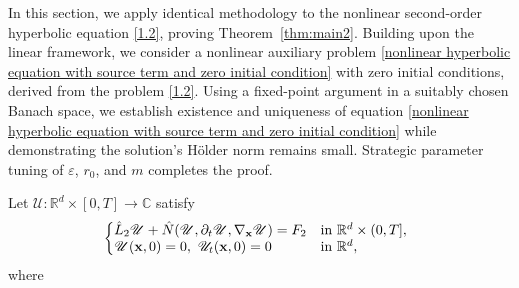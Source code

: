 \documentclass[11pt,reqno,oneside]{amsart}
\numberwithin{equation}{section}
\theoremstyle{definition}
\theoremstyle{remark}
\numberwithin{equation}{section}
\begin{document}
	
	
	In this section, we apply identical methodology to the nonlinear second-order hyperbolic equation \eqref{1.2}, proving Theorem~\ref{thm:main2}. Building upon the linear framework, we consider a nonlinear auxiliary problem \eqref{nonlinear hyperbolic equation with source term and zero initial condition} with zero initial conditions, derived from the problem \eqref{1.2}. Using a fixed-point argument in a suitably chosen Banach space, we establish existence and uniqueness of equation \eqref{nonlinear hyperbolic equation with source term and zero initial condition} while demonstrating the solution's H\" older norm remains small. Strategic parameter tuning of $\varepsilon$, $r_0$, and $m$ completes the proof.
	
	Let $\mathscr{U}:\mathbb{R}^d\times [0,T]\rightarrow \mathbb{C}$ satisfy
	\begin{equation}\label{nonlinear hyperbolic equation with source term and zero initial condition}
		\left\{
		\begin{array}{@{}l@{\quad}l}
			\hat{L}_2 \mathscr{U} + \hat{N}(\mathscr{U}, \partial_t \mathscr{U}, \nabla_\mathbf{x} \mathscr{U}) = F_2 & \text{in } \mathbb{R}^d \times (0,T], \\
			\mathscr{U}(\mathbf{x},0) = 0,\ \mathscr{U}_t(\mathbf{x},0) = 0 & \text{in } \mathbb{R}^{d},
		\end{array}
		\right.
	\end{equation}
	where 
\end{document}
